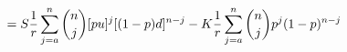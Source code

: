 \documentclass[preview]{standalone}
\begin{document}
\begin{align*}
= S {1 \over r} \sum^{n}_{j=a} {{n}\choose{j}} [ p u ] ^{j} [ (1-p) d ]^{n-j} - K {1 \over r} \sum^{n}_{j=a} {{n}\choose{j}} p^{j} (1-p)^{n-j}
\end{align*}
\end{document}
